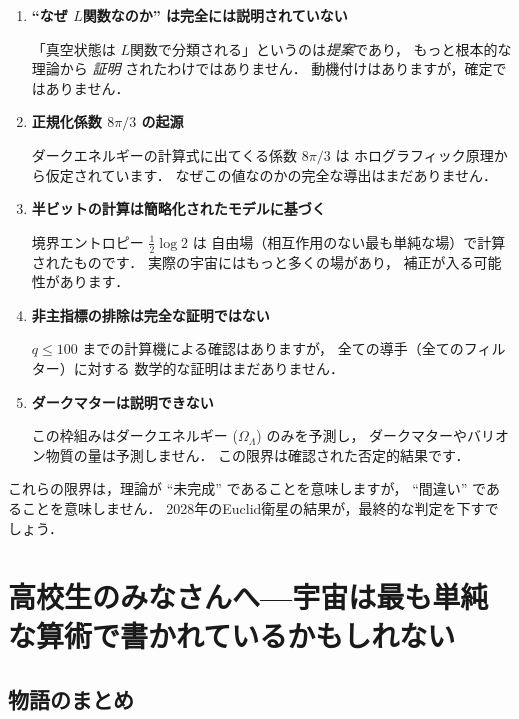 \documentclass[11pt,a4paper]{article}
\begin{document}
\begin{tcolorbox}[colback=gray!5,colframe=gray!50!black,title=この理論の限界]
\begin{enumerate}
\item \textbf{``なぜ $L$関数なのか'' は完全には説明されていない}

「真空状態は $L$関数で分類される」というのは\emph{提案}であり，
もっと根本的な理論から \emph{証明} されたわけではありません．
動機付けはありますが，確定ではありません．

\item \textbf{正規化係数 $8\pi/3$ の起源}

ダークエネルギーの計算式に出てくる係数 $8\pi/3$ は
ホログラフィック原理から仮定されています．
なぜこの値なのかの完全な導出はまだありません．

\item \textbf{半ビットの計算は簡略化されたモデルに基づく}

境界エントロピー $\frac{1}{2}\log 2$ は
自由場（相互作用のない最も単純な場）で計算されたものです．
実際の宇宙にはもっと多くの場があり，
補正が入る可能性があります．

\item \textbf{非主指標の排除は完全な証明ではない}

$q \leq 100$ までの計算機による確認はありますが，
全ての導手（全てのフィルター）に対する
数学的な証明はまだありません．

\item \textbf{ダークマターは説明できない}

この枠組みはダークエネルギー ($\Omega_\Lambda$) のみを予測し，
ダークマターやバリオン物質の量は予測しません．
この限界は確認された否定的結果です．
\end{enumerate}
\end{tcolorbox}

これらの限界は，理論が ``未完成'' であることを意味しますが，
``間違い'' であることを意味しません．
2028年のEuclid衛星の結果が，最終的な判定を下すでしょう．

\section{高校生のみなさんへ---宇宙は最も単純な算術で書かれているかもしれない}

\subsection{物語のまとめ}
\end{document}
